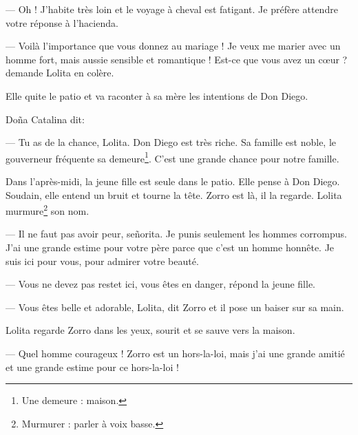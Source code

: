 --- Oh ! J'habite très loin et le voyage à cheval est fatigant. Je préfère attendre votre réponse à l'hacienda.

--- Voilà l'importance que vous donnez au mariage ! Je veux me marier avec un homme fort, mais aussie sensible et
    romantique ! Est-ce que vous avez un cœur ? demande Lolita en colère.

Elle quite le patio et va raconter à sa mère les intentions de Don Diego.

Doña Catalina dit:

--- Tu as de la chance, Lolita. Don Diego est très riche. Sa famille est noble, le gouverneur fréquente sa
    demeure\footnote{Une demeure : maison.}. C'est une grande chance pour notre famille.

Dans l'après-midi, la jeune fille est seule dans le patio. Elle pense à Don Diego. Soudain, elle entend un bruit et
tourne la tête. Zorro est là, il la regarde. Lolita murmure\footnote{Murmurer : parler à voix basse.} son nom.

--- Il ne faut pas avoir peur, señorita. Je punis seulement les hommes corrompus. J'ai une grande estime pour votre
    père parce que c'est un homme honnête. Je suis ici pour vous, pour admirer votre beauté.

--- Vous ne devez pas restet ici, vous êtes en danger, répond la jeune fille.

--- Vous êtes belle et adorable, Lolita, dit Zorro et il pose un baiser sur sa main.

Lolita regarde Zorro dans les yeux, sourit et se sauve vers la maison.

--- Quel homme courageux ! Zorro est un hors-la-loi, mais j'ai une grande amitié et une grande estime pour ce
    hors-la-loi !
